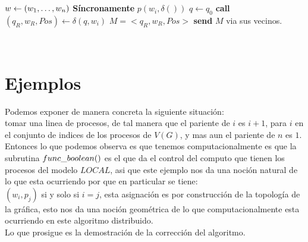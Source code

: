 \documentclass[10pt]{article}
\begin{document}
    \\\\
    \begin{algorithm}
        \begin{algorithmic}
            \STATE $w \gets (w_{1}, \mathellipsis, w_{n})$
            \STATE \textbf{Síncronamente}
                    \STATE $p(w_i,\delta())$
                    \STATE $q \gets q_{0}$
                      \STATE \textbf{call} $(q_{R},w_{R},Pos) \gets \delta(q,w_{i})$
                    \ENDWHILE
                    \ELSE
                       \STATE $M = <q_{R},w_{R}, Pos>$
                       \STATE \textbf{send} $M$ via sus vecinos.
                    \ENDIF
            \ENDFOR
        \end{algorithmic}
        \caption{$Simulate\char95 Algo \char95 TM(w,G,TM)$\label{lss}}
    \end{algorithm}
    \\
    \section{Ejemplos}\label{sec:ejemplos}
    Podemos exponer de manera concreta la siguiente situación: \\ tomar una linea de procesos, de tal manera que el pariente de $i$ es $i+1$, para $i$ en el
    conjunto de indices de los procesos de $V(G)$, y mas aun el pariente de $n$ es $1$.\\
    Entonces lo que podemos observa es que tenemos computacionalmente es que la subrutina
    $func \char95 boolean()$ es el que da el control del computo que tienen los procesos del modelo $LOCAL$,
    asi que este ejemplo nos da una noción natural de lo que esta ocurriendo por que en particular se tiene:\\
    $(w_{i},p_{j})$ si y solo si $i=j$, esta asignación es por construcción de la topología de la gráfica,
    esto nos da una noción geométrica de lo que computacionalmente esta ocurriendo en este algoritmo distribuido.
    \\
    Lo que prosigue es la demostración de la corrección del algoritmo.
    \\

\end{document}
